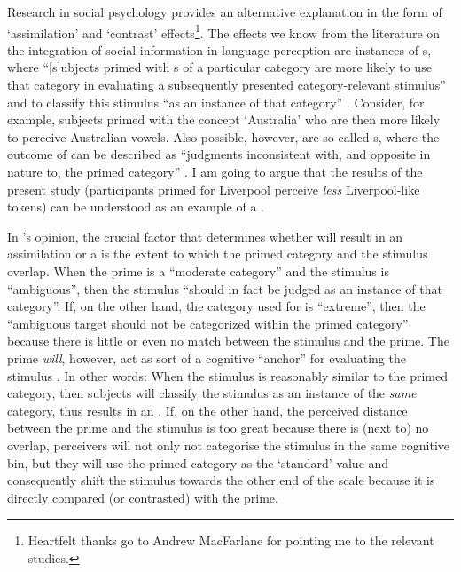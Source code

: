Research in social psychology provides an alternative explanation in the form of `assimilation' and `contrast' effects\footnote{Heartfelt thanks go to Andrew MacFarlane for pointing me to the relevant studies.}.
The  effects we know from the literature on the integration of social information in language perception are instances of s, where ``[s]ubjects primed with s of a particular category are more likely to use that category in evaluating a subsequently presented category-relevant stimulus'' and to classify this stimulus ``as an instance of that category'' \parencite[1106--1107]{herr1986}.
Consider, for example, subjects primed with the concept `Australia' who are then more likely to perceive Australian vowels.
Also possible, however, are so-called s, where the outcome of  can be described as ``judgments inconsistent with, and opposite in nature to, the primed category'' \parencite[1107]{herr1986}.
I am going to argue that the results of the present study (participants primed for Liverpool perceive \emph{less} Liverpool-like tokens) can be understood as an example of a .

In \citeauthor{herr1986}'s opinion, the crucial factor that determines whether  will result in an assimilation or a  is the extent to which the primed category and the stimulus overlap.
When the prime is a ``moderate category'' and the stimulus is ``ambiguous'', then the stimulus ``should in fact be judged as an instance of that category''.
If, on the other hand, the category used for  is ``extreme'', then the ``ambiguous target should not be categorized within the primed category'' because there is little or even no match between the stimulus and the prime.
The prime \emph{will}, however, act as sort of a cognitive ``anchor'' for evaluating the stimulus \parencite[cf.][1107]{herr1986}.
In other words: When the stimulus is reasonably similar to the primed category, then subjects will classify the stimulus as an instance of the \emph{same} category,  thus results in an .
If, on the other hand, the perceived distance between the prime and the stimulus is too great because there is (next to) no overlap, perceivers will not only not categorise the stimulus in the same cognitive bin, but they will use the primed category as the `standard' value and consequently shift the stimulus towards the other end of the scale because it is directly compared (or contrasted) with the prime.

